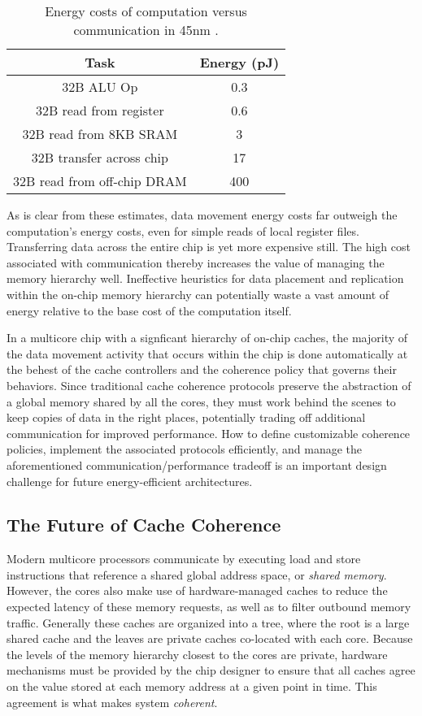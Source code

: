 \begin{table}[tdp]
\begin{center}
\begin{tabular}{|c|c|} 
\hline
Task & Energy (pJ) \\ \hline
32B ALU Op & 0.3 \\ \hline
32B read from register & 0.6 \\ \hline
32B read from 8KB SRAM & 3 \\ \hline
32B transfer across chip & 17 \\ \hline
32B read from off-chip DRAM & 400 \\ \hline
\end{tabular}
\end{center}
\caption{Energy costs of computation versus communication in 45nm \cite{dally-hpca02}. }
\label{tab:movement}
\end{table}

As is clear from these estimates, data movement energy costs far outweigh the computation's energy costs, even for simple reads of local register files.
Transferring data across the entire chip is yet more expensive still.
The high cost associated with communication thereby increases the value of managing the memory hierarchy well.
Ineffective heuristics for data placement and replication within the on-chip memory hierarchy can potentially waste a vast amount of energy relative to the base cost of the computation itself.

In a multicore chip with a signficant hierarchy of on-chip caches, the majority of the data movement activity that occurs within the chip is done automatically at the behest of the cache controllers and the coherence policy that governs their behaviors.
Since traditional cache coherence protocols preserve the abstraction of a global memory shared by all the cores,
they must work behind the scenes to keep copies of data in the right places,
potentially trading off additional communication for improved performance.
How to define customizable coherence policies, implement the associated protocols efficiently,
and manage the aforementioned communication/performance tradeoff is an important design challenge for future energy-efficient architectures. 

\subsection{The Future of Cache Coherence}

Modern multicore processors communicate by executing load and store instructions that reference a shared global address space, or {\em shared memory}.
However, the cores also make use of hardware-managed caches to reduce the expected latency of these memory requests, as well as to filter outbound memory traffic.
Generally these caches are organized into a tree, where the root is a large shared cache and the leaves are private caches co-located with each core.
Because the levels of the memory hierarchy closest to the cores are private, hardware mechanisms must be provided by the chip designer to ensure that all caches agree on the value stored at each memory address at a given point in time.
This agreement is what makes system {\em coherent}.

